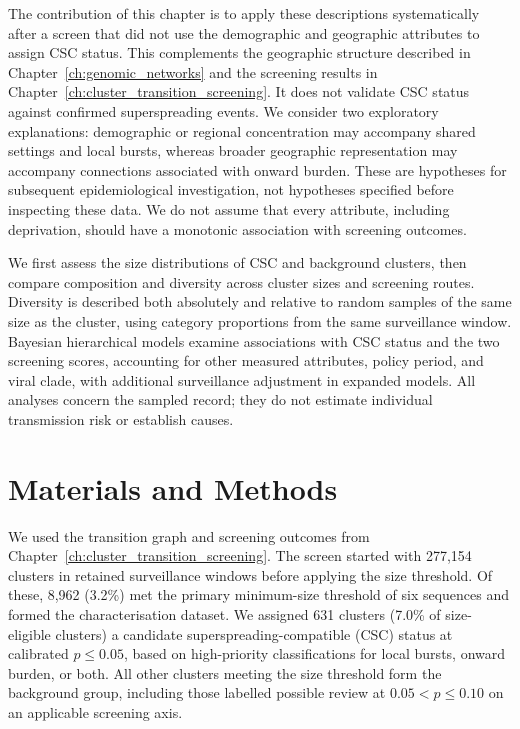 The contribution of this chapter is to apply these descriptions systematically after a screen that did not use the demographic and geographic attributes to assign CSC status. This complements the geographic structure described in Chapter~\ref{ch:genomic_networks} and the screening results in Chapter~\ref{ch:cluster_transition_screening}. It does not validate CSC status against confirmed superspreading events. We consider two exploratory explanations: demographic or regional concentration may accompany shared settings and local bursts, whereas broader geographic representation may accompany connections associated with onward burden. These are hypotheses for subsequent epidemiological investigation, not hypotheses specified before inspecting these data. We do not assume that every attribute, including deprivation, should have a monotonic association with screening outcomes.

We first assess the size distributions of CSC and background clusters, then compare composition and diversity across cluster sizes and screening routes. Diversity is described both absolutely and relative to random samples of the same size as the cluster, using category proportions from the same surveillance window. Bayesian hierarchical models examine associations with CSC status and the two screening scores, accounting for other measured attributes, policy period, and viral clade, with additional surveillance adjustment in expanded models. All analyses concern the sampled record; they do not estimate individual transmission risk or establish causes.

\section{Materials and Methods}\label{sec:ch6_methods}

We used the transition graph and screening outcomes from Chapter~\ref{ch:cluster_transition_screening}. The screen started with 277,154 clusters in retained surveillance windows before applying the size threshold. Of these, 8,962 (3.2\%) met the primary minimum-size threshold of six sequences and formed the characterisation dataset. We assigned 631 clusters (7.0\% of size-eligible clusters) a candidate superspreading-compatible (CSC) status at calibrated $p \leq 0.05$, based on high-priority classifications for local bursts, onward burden, or both. All other clusters meeting the size threshold form the background group, including those labelled possible review at $0.05<p\leq0.10$ on an applicable screening axis.

